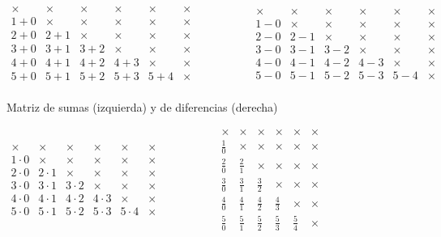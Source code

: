 \begin{center}
$\begin{matrix}
\times  & \times  & \times  & \times  & \times  & \times \\
1+0     & \times  & \times  & \times  & \times  & \times \\
2+0     & 2+1     & \times  & \times  & \times  & \times \\
3+0     & 3+1     & 3+2     & \times  & \times  & \times \\
4+0     & 4+1     & 4+2     & 4+3     & \times  & \times \\
5+0     & 5+1     & 5+2     & 5+3     & 5+4     & \times \\
\end{matrix}
\ \ \ \ \ \ \ \ \ \ \ \ \ \ \ \ \ \ \ \ \ \ \begin{matrix}
\times  & \times  & \times  & \times  & \times  & \times \\
1-0     & \times  & \times  & \times  & \times  & \times \\
2-0     & 2-1     & \times  & \times  & \times  & \times \\
3-0     & 3-1     & 3-2     & \times  & \times  & \times \\
4-0     & 4-1     & 4-2     & 4-3     & \times  & \times \\
5-0     & 5-1     & 5-2     & 5-3     & 5-4     & \times \\
\end{matrix}$

Matriz de sumas (izquierda) y de diferencias (derecha)

$\begin{matrix}
\times  & \times  & \times  & \times  & \times  & \times \\
1\cdot0 & \times  & \times  & \times  & \times  & \times \\
2\cdot0 & 2\cdot1 & \times  & \times  & \times  & \times \\
3\cdot0 & 3\cdot1 & 3\cdot2 & \times  & \times  & \times \\
4\cdot0 & 4\cdot1 & 4\cdot2 & 4\cdot3 & \times  & \times \\
5\cdot0 & 5\cdot1 & 5\cdot2 & 5\cdot3 & 5\cdot4 & \times \\
\end{matrix}
\ \ \ \ \ \ \ \ \ \ \ \ \ \ \ \ \ \ \ \ \ \ \begin{matrix}
\times      & \times      & \times      & \times      & \times      & \times \\
\frac{1}{0} & \times      & \times      & \times      & \times      & \times \\
\frac{2}{0} & \frac{2}{1} & \times      & \times      & \times      & \times \\
\frac{3}{0} & \frac{3}{1} & \frac{3}{2} & \times      & \times      & \times \\
\frac{4}{0} & \frac{4}{1} & \frac{4}{2} & \frac{4}{3} & \times      & \times \\
\frac{5}{0} & \frac{5}{1} & \frac{5}{2} & \frac{5}{3} & \frac{5}{4} & \times \\
\end{matrix}$


\end{center}
